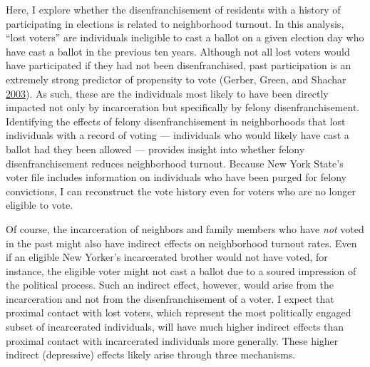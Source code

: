 \documentclass[
  12pt,
]{article}
\begin{document}
Here, I explore whether the disenfranchisement of residents with a history of participating in elections is related to neighborhood turnout. In this analysis, ``lost voters'' are individuals ineligible to cast a ballot on a given election day who have cast a ballot in the previous ten years. Although not all lost voters would have participated if they had not been disenfranchised, past participation is an extremely strong predictor of propensity to vote (Gerber, Green, and Shachar \protect\hyperlink{ref-Gerber2003}{2003}). As such, these are the individuals most likely to have been directly impacted not only by incarceration but specifically by felony disenfranchisement. Identifying the effects of felony disenfranchisement in neighborhoods that lost individuals with a record of voting --- individuals who would likely have cast a ballot had they been allowed --- provides insight into whether felony disenfranchisement reduces neighborhood turnout. Because New York State's voter file includes information on individuals who have been purged for felony convictions, I can reconstruct the vote history even for voters who are no longer eligible to vote.

Of course, the incarceration of neighbors and family members who have \emph{not} voted in the past might also have indirect effects on neighborhood turnout rates. Even if an eligible New Yorker's incarcerated brother would not have voted, for instance, the eligible voter might not cast a ballot due to a soured impression of the political process. Such an indirect effect, however, would arise from the incarceration and not from the disenfranchisement of a voter. I expect that proximal contact with lost voters, which represent the most politically engaged subset of incarcerated individuals, will have much higher indirect effects than proximal contact with incarcerated individuals more generally. These higher indirect (depressive) effects likely arise through three mechanisms.
\end{document}
